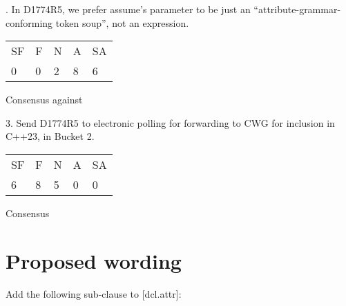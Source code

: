 . In D1774R5, we prefer assume’s parameter to be just an “attribute-grammar-conforming token soup”, not an expression.

\hspace{6mm}
\begin{tabular}{lllll}
SF & F & N & A & SA \\
0 & 0 & 2 & 8 & 6
\end{tabular}
\hspace{5mm}Consensus against

3. Send D1774R5 to electronic polling for forwarding to CWG for inclusion in C++23, in Bucket 2.

\hspace{6mm}
\begin{tabular}{lllll}
SF & F & N & A & SA \\
6 & 8 & 5 & 0 & 0
\end{tabular}
\hspace{5mm}Consensus



\section{Proposed wording}
\label{sec:wording}

Add the following sub-clause to [dcl.attr]:

